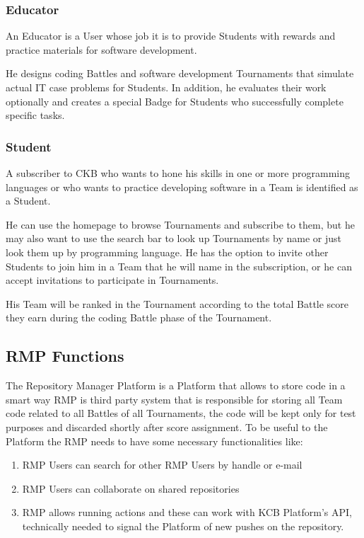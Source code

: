 \subsubsection{Educator}
An Educator is a User whose job it is to provide Students with rewards and practice materials for software development.

He designs coding Battles and software development Tournaments that simulate actual IT case problems for Students. In addition, he evaluates their work optionally and creates a special Badge for Students who successfully complete 
specific tasks.

\subsubsection{Student}
A subscriber to CKB who wants to hone his skills in one or more programming languages or who wants to practice developing software in a Team is identified as a Student.

He can use the homepage to browse Tournaments and subscribe to them, but he may also want to use the search bar to look up Tournaments by name or just look them up by programming language. He has the option to invite other Students
to join him in a Team that he will name in the subscription, or he can accept invitations to participate in Tournaments.

His Team will be ranked in the Tournament according to the total Battle score they earn during the coding Battle phase of the Tournament.

\subsection{RMP Functions}
The Repository Manager Platform is a Platform that allows to store code in a smart way
RMP is third party system that is responsible for storing all Team code related to all Battles of all Tournaments, the code will be kept only for test purposes and discarded shortly after score assignment. 
To be useful to the Platform the RMP needs to have some necessary functionalities like:
\begin{enumerate}
    \item RMP Users can search for other RMP Users by handle or e-mail
    \item RMP Users can collaborate on shared repositories
    \item RMP allows running actions and these can work with KCB Platform's API, technically needed to signal the Platform of new pushes on the repository.
\end{enumerate}

